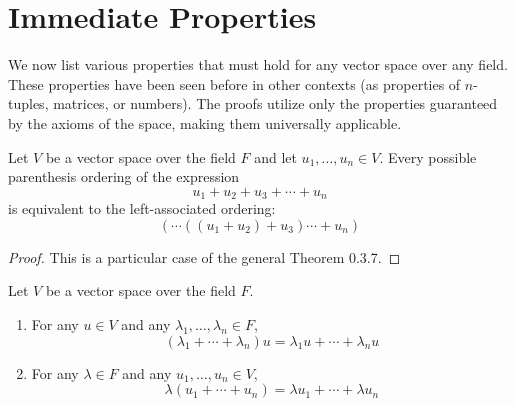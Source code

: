 
\section{Immediate Properties}

\begin{note}
    We now list various properties that must hold for any vector space over any field. These properties have been seen before in other contexts (as properties of $n$-tuples, matrices, or numbers). The proofs utilize only the properties guaranteed by the axioms of the space, making them universally applicable.
\end{note}

\begin{theorem}\label{thm:generalized-associativity}
    Let $V$ be a vector space over the field $F$ and let $u_1, \ldots, u_n \in V$. Every possible parenthesis ordering of the expression
    \[
    u_1 + u_2 + u_3 + \cdots + u_n
    \]
    is equivalent to the left-associated ordering:
    \[
    (\cdots((u_1 + u_2) + u_3) \cdots + u_n)
    \]
\end{theorem}

\begin{proof}
    This is a particular case of the general Theorem 0.3.7.
\end{proof}

\begin{theorem}\label{thm:generalized-distributivity}
    Let $V$ be a vector space over the field $F$.
    \begin{enumerate}[label=\roman*.]
        \item For any $u \in V$ and any $\lambda_1, \ldots, \lambda_n \in F$,
        \[
        (\lambda_1 + \cdots + \lambda_n)u = \lambda_1 u + \cdots + \lambda_n u
        \]
        \item For any $\lambda \in F$ and any $u_1, \ldots, u_n \in V$,
        \[
        \lambda(u_1 + \cdots + u_n) = \lambda u_1 + \cdots + \lambda u_n
        \]
    \end{enumerate}
\end{theorem}

